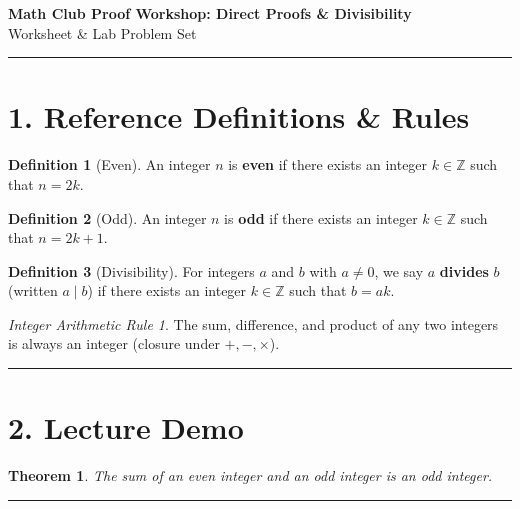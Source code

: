 \documentclass[11pt]{article}
\theoremstyle{definition}
\newtheorem{definition}{Definition}
\theoremstyle{plain}
\newtheorem{theorem}{Theorem}
\theoremstyle{remark}
\newtheorem*{remark}{Integer Arithmetic Rule}
\begin{document}
\begin{center}
    {\LARGE \textbf{Math Club Proof Workshop: Direct Proofs \& Divisibility}} \\[4pt]
    {\large Worksheet \& Lab Problem Set}
\end{center}

\vspace{0.5em}
\hrule
\vspace{1em}

\section*{1. Reference Definitions \& Rules}

\begin{definition}[Even]
    An integer \(n\) is \textbf{even} if there exists an integer \(k \in \mathbb{Z}\) such that \(n = 2k\).
\end{definition}

\begin{definition}[Odd]
    An integer \(n\) is \textbf{odd} if there exists an integer \(k \in \mathbb{Z}\) such that \(n = 2k + 1\).
\end{definition}

\begin{definition}[Divisibility]
    For integers \(a\) and \(b\) with \(a \neq 0\), we say \(a\) \textbf{divides} \(b\) (written \(a \mid b\)) if there exists an integer \(k \in \mathbb{Z}\) such that \(b = ak\).
\end{definition}

\begin{remark}
    The sum, difference, and product of any two integers is always an integer (closure under \(+,-,\times\)).
\end{remark}

\vspace{0.5em}
\hrule
\vspace{1em}

\section*{2. Lecture Demo}

\begin{theorem}
    The sum of an even integer and an odd integer is an odd integer.
\end{theorem}

\vspace{0.5em}
\hrule
\vspace{1em}
\end{document}
